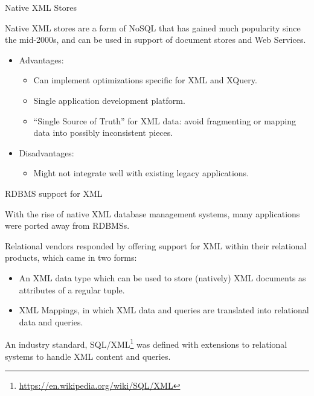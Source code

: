 \begin{frame}{Native XML Stores}

Native XML stores are a form of NoSQL that has gained much popularity since the mid-2000s, and can be used in support of document stores and Web Services.

\begin{itemize}[-]
\item Advantages:
\begin{itemize}[-]
\item Can implement optimizations specific for XML and XQuery.
\item Single application development platform.
\item ``Single Source of Truth'' for XML data: avoid fragmenting or mapping data into possibly inconsistent pieces.
\end{itemize}
\item Disadvantages:
\begin{itemize}[-]
\item Might not integrate well with existing legacy applications.
\end{itemize}
\end{itemize}
\end{frame}


\begin{frame}{RDBMS support for XML}

With the rise of native XML database management systems, many applications were ported away from RDBMSs. 

Relational vendors responded by offering support for XML within their relational products, which came in two forms: 

\begin{itemize}[-]
\item An \alert{XML data type} which can be used to store (\alert{native}ly) XML documents as attributes of a regular tuple.
\item \alert{XML Mappings}, in which XML data and queries are \alert{translated} into relational data and queries.
\end{itemize}

An industry standard, SQL/XML\footnote{\url{https://en.wikipedia.org/wiki/SQL/XML}} was defined with extensions to relational systems to handle XML content and queries.

\end{frame}


